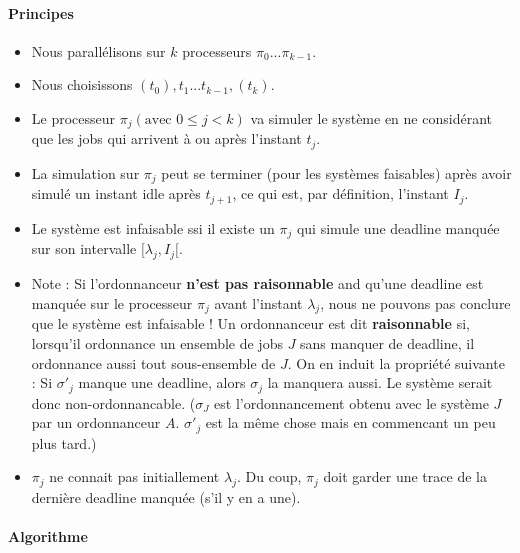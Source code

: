 \paragraph{Principes}
\begin{itemize}
\item Nous parallélisons sur $k$ processeurs $\pi_{0}...\pi_{k-1}$.
\item Nous choisissons $(t_{0}), t_{1}...t_{k-1}, (t_{k})$.
\item Le processeur $\pi_{j} (\text{avec } 0 \leq j < k)$ va simuler le système en ne considérant que les jobs qui arrivent à ou après l'instant $t_{j}$.
\item La simulation sur $\pi_{j}$ peut se terminer (pour les systèmes faisables) après avoir simulé un instant idle après $t_{j+1}$, ce qui est, par définition, l'instant $I_{j}$.
\item Le système est infaisable ssi il existe un $\pi_{j}$ qui simule une deadline manquée sur son intervalle $[\lambda_{j}, I_{j}[$.
\item Note : Si l'ordonnanceur \textbf{n'est pas raisonnable} and qu'une deadline est manquée sur le processeur $\pi_{j}$ avant l'instant $\lambda_{j}$, nous ne pouvons pas conclure que le système est infaisable !
Un ordonnanceur est dit \textbf{raisonnable} si, lorsqu'il ordonnance un ensemble de jobs $J$ sans manquer de deadline, il ordonnance aussi tout sous-ensemble de $J$. On en induit la propriété suivante : Si $\sigma'_{j}$ manque une deadline, alors $\sigma_{j}$ la manquera aussi. Le système serait donc non-ordonnancable. ($\sigma_{J}$ est l'ordonnancement obtenu avec le système $J$ par un ordonnanceur $A$. $\sigma'_{j}$ est la même chose mais en commencant un peu plus tard.)


\item $\pi_{j}$ ne connait pas initiallement $\lambda_{j}$. Du coup, $\pi_{j}$ doit garder une trace de la dernière deadline manquée (s'il y en a une).
\end{itemize}

\paragraph{Algorithme}
